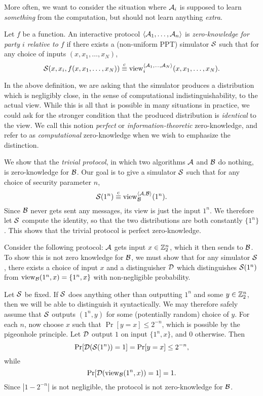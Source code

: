 More often, we want to consider the situation where $\mathcal{A}_i$ is supposed to learn
\emph{something} from the computation, but should not learn anything
\emph{extra}.

\begin{dfn}\label{def:zero-knowledge}
  Let $f$ be a function. An interactive protocol $\langle\mathcal{A}_1, \dots, \mathcal{A}_n\rangle$ is
  \emph{zero-knowledge for party $i$ relative to $f$} if there exists a
  (non-uniform PPT) simulator $\mathcal{S}$ such that for any choice of
  inputs $(x, x_1, \dots, x_N)$, \[
  \mathcal{S}(x, x_i, f(x, x_1, \dots, x_N)) \overset{\text{c}}{\equiv} \operatorname{view}_i^{\langle\mathcal{A}_1, \dots, \mathcal{A}_N\rangle}(x, x_1, \dots, x_N).
\]
\end{dfn}

In the above definition, we are asking that the simulator produces a
distribution which is negligibly close, in the sense of computational
indistinguishability, to the actual view. While this is all that is possible in
many situations in practice, we could ask for the stronger condition that the
produced distribution is \emph{identical} to the view. We call this notion
\emph{perfect} or \emph{information-theoretic} zero-knowledge, and refer to
 as
\emph{computational} zero-knowledge when we wish to emphasize the distinction.

\begin{ex}\label{ex:trivial-protocol}
  We show that the \emph{trivial protocol}, in which two algorithms $\mathcal{A}$ and
  $\mathcal{B}$ do nothing, is zero-knowledge for $\mathcal{B}$. Our goal is to give a
  simulator $\mathcal{S}$ such that for any choice of security parameter $n$,
  \[
    \mathcal{S}(1^n) \overset{\text{c}}{\equiv} \operatorname{view}_{\mathcal{B}}^{\langle\mathcal{A}, \mathcal{B}\rangle}(1^n).
  \] Since $\mathcal{B}$ never gets sent any messages, its view is just the input
  $1^n$. We therefore let $\mathcal{S}$ compute the identity, so that the two
  distributions are both constantly $\{1^n\}$. This shows that the trivial
  protocol is perfect zero-knowledge.
\end{ex}

\begin{ex}\label{ex:non-zero-knowledge}
  Consider the following protocol: $\mathcal{A}$ gets input $x\in\mathbb{Z}_2^n$, which it
  then sends to $\mathcal{B}$. To show this is not zero knowledge for $\mathcal{B}$, we must
  show that for any simulator $\mathcal{S}$, there exists a choice of input $x$ and a
  distinguisher $\mathcal{D}$ which distinguishes $\mathcal{S}(1^n)$ from $\operatorname{view}_{\mathcal{B}}(1^n, x) =
  \{1^n, x\}$ with non-negligible probability.

  Let $\mathcal{S}$ be fixed. If $\mathcal{S}$ does anything other than outputting $1^n$ and
  some $y\in\mathbb{Z}_2^n$, then we will be able to distinguish it syntactically.
  We may therefore safely assume that $\mathcal{S}$ outputs $(1^n, y)$ for some
  (potentially random) choice of $y$. For each $n$, now choose $x$ such that
  $\Pr[y = x]\leq 2^{-n}$, which is possible by the pigeonhole principle. Let
  $\mathcal{D}$ output $1$ on input $\{1^n, x\}$, and $0$ otherwise. Then \[
    \Pr[\mathcal{D}(\mathcal{S}(1^n)) = 1] = \Pr[y = x] \leq 2^{-n},
  \] while \[
    \Pr[\mathcal{D}(\operatorname{view}_{\mathcal{B}}(1^n, x)) = 1] = 1.
  \] Since $|1 - 2^{-n}|$ is not negligible, the protocol is not
  zero-knowledge for $\mathcal{B}$.
\end{ex}

